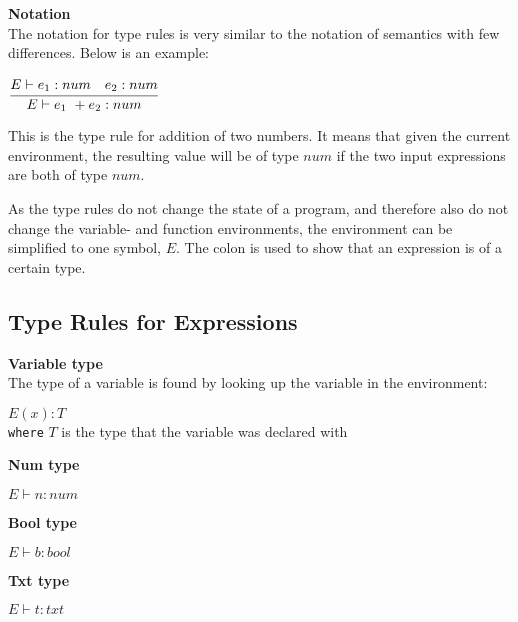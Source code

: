 \textbf{Notation}\\
The notation for type rules is very similar to the notation of semantics with few differences.
Below is an example:\\
\begin{center}
	\begin{math}
	\cfrac
	{E \vdash e_1 : num \quad e_2 : num}
	{E \vdash e_1\ + e_2 : num}
	\end{math}
\end{center}
This is the type rule for addition of two numbers.
It means that given the current environment, the resulting value will be of type $num$ if the two input expressions are both of type $num$.

As the type rules do not change the state of a program, and therefore also do not change the variable- and function environments, the environment can be simplified to one symbol, $E$.
The colon is used to show that an expression is of a certain type.

\subsection{Type Rules for Expressions}


\textbf{Variable type}\\
The type of a variable is found by looking up the variable in the environment:\\
\begin{center}
	\begin{math}
	E(x) : T
	\end{math}
	\\[1\baselineskip]
	\texttt{where} $T$ is the type that the variable was declared with
\end{center}


\textbf{Num type}\\
\begin{center}
	\begin{math}
		E \vdash n : num
	\end{math}
\end{center}

\textbf{Bool type}\\
\begin{center}
	\begin{math}
	E \vdash b : bool
	\end{math}
\end{center}

\textbf{Txt type}\\
\begin{center}
	\begin{math}
	E \vdash t : txt
	\end{math}
\end{center}

